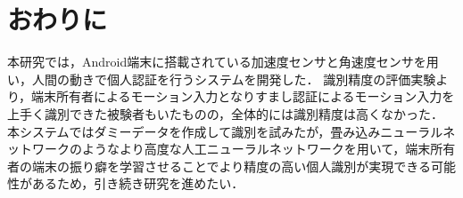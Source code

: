 \section{おわりに}
本研究では，Android端末に搭載されている加速度センサと角速度センサを用い，人間の動きで個人認証を行うシステムを開発した．
識別精度の評価実験より，端末所有者によるモーション入力となりすまし認証によるモーション入力を上手く識別できた被験者もいたものの，全体的には識別精度は高くなかった．
本システムではダミーデータを作成して識別を試みたが，畳み込みニューラルネットワークのようなより高度な人工ニューラルネットワークを用いて，端末所有者の端末の振り癖を学習させることでより精度の高い個人識別が実現できる可能性があるため，引き続き研究を進めたい．

